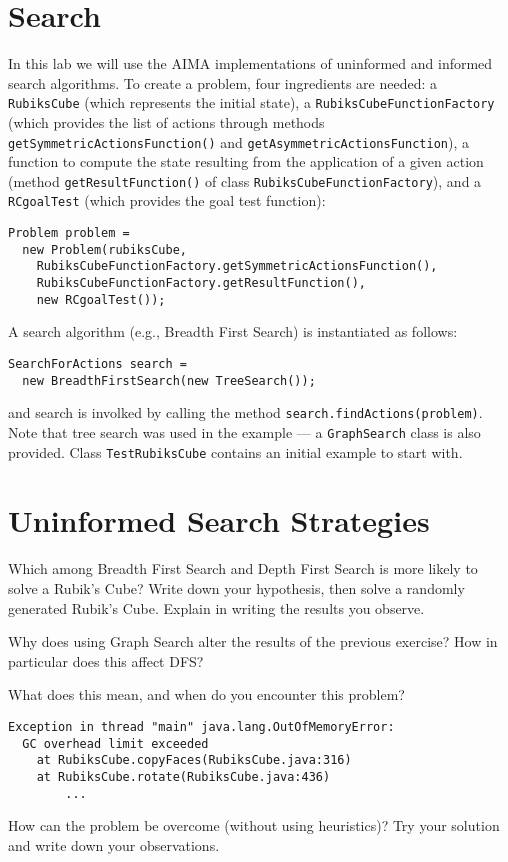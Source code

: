 \documentclass[a4paper]{article}
\begin{document}
\section{Search}
In this lab we will use the AIMA implementations of uninformed and informed search algorithms.  To create a problem, four ingredients are needed: a {\tt RubiksCube} (which represents the initial state), a {\tt RubiksCubeFunctionFactory} (which provides the list of actions through methods {\tt getSymmetricActionsFunction()} and {\tt getAsymmetricActionsFunction}), a function to compute the state resulting from the application of a given action (method {\tt getResultFunction()} of class {\tt RubiksCubeFunctionFactory}), and a {\tt RCgoalTest} (which provides the goal test function):

\begin{lstlisting}
Problem problem =
  new Problem(rubiksCube,
    RubiksCubeFunctionFactory.getSymmetricActionsFunction(),
    RubiksCubeFunctionFactory.getResultFunction(),
    new RCgoalTest());
\end{lstlisting}

\noindent A search algorithm (e.g., Breadth First Search) is instantiated as follows:

\begin{lstlisting}
SearchForActions search =
  new BreadthFirstSearch(new TreeSearch());
\end{lstlisting}

\noindent and search is involked by calling the method {\tt search.findActions(problem)}.  Note that tree search was used in the example --- a {\tt GraphSearch} class is also provided.  Class {\tt TestRubiksCube} contains an initial example to start with.

\section{Uninformed Search Strategies}

{\ex{}\label{ex:ex1} Which among Breadth First Search and Depth First Search is more likely to solve a Rubik's Cube?  Write down your hypothesis, then solve a randomly generated Rubik's Cube.  Explain in writing the results you observe.\vspace{0.1cm}}

{\ex{}\label{ex:ex2} Why does using Graph Search alter the results of the previous exercise?  How in particular does this affect DFS?\vspace{0.1cm}}

{\ex{}\label{ex:ex3} What does this mean, and when do you encounter this problem?  
\begin{lstlisting}
Exception in thread "main" java.lang.OutOfMemoryError:
  GC overhead limit exceeded
    at RubiksCube.copyFaces(RubiksCube.java:316)
    at RubiksCube.rotate(RubiksCube.java:436)
        ...
\end{lstlisting}
How can the problem be overcome (without using heuristics)?  Try your solution and write down your observations.
\vspace{0.1cm}}
\end{document}
